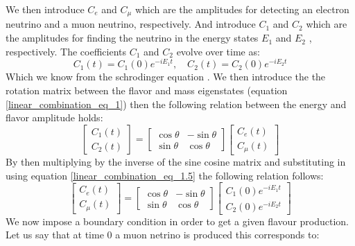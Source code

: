 We then introduce $C_e$ and $C_\mu$ which are the amplitudes for detecting an electron neutrino and a muon neutrino, respectively. And introduce $C_1$ and $C_2$ which are the amplitudes for finding the neutrino in the energy states $E_1$ and $E_2$ , respectively. The coefficients $C_1$ and $C_2$ evolve over time as:
\begin{equation}
    C_1(t) = C_1(0)e^{-iE_1t}, \quad  C_2(t) = C_2(0)e^{-iE_2t}
    \label{linear_combination_eq_1.5}
\end{equation}
Which we know from the schrodinger equation \cite{sassaroli1999neutrino} \cite{griffiths2008book}\cite{griffiths2008neutrinoOscillations}. We then introduce the the rotation matrix between the flavor and mass eigenstates (equation \ref{linear_combination_eq_1}) then the following relation between the energy and flavor amplitude holds:
\begin{equation}
    \begin{bmatrix}
        C_1(t) \\
        C_2(t)
    \end{bmatrix}
    =
    \begin{bmatrix}
        \cos\theta & -\sin\theta \\
        \sin\theta & \cos\theta 
    \end{bmatrix}
        \begin{bmatrix}
        C_e(t) \\
        C_\mu(t)
    \end{bmatrix}
    \label{linear_combination_eq_2}
\end{equation}
By then multiplying by the inverse of the sine cosine matrix and substituting in using equation \ref{linear_combination_eq_1.5} the following relation follows:
\begin{equation}
    \begin{bmatrix}
        C_e(t) \\
        C_\mu(t)
    \end{bmatrix}
    =
    \begin{bmatrix}
        \cos\theta & -\sin\theta \\
        \sin\theta & \cos\theta 
    \end{bmatrix}
        \begin{bmatrix}
        C_1(0)e^{-iE_1t} \\
        C_2(0)e^{-iE_2t}
    \end{bmatrix}
    \label{linear_combination_eq_3}
\end{equation}
We now impose a boundary condition in order to get a given flavour production. Let us say that at time 0 a muon netrino is produced this corresponds to:

